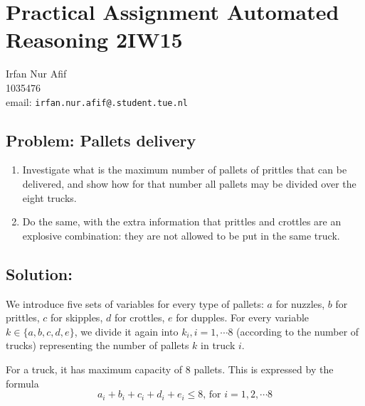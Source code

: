 \documentclass[12pt]{article}
\begin{document}
\section*{Practical
Assignment Automated Reasoning 2IW15 }

\begin{center}
Irfan Nur Afif \\
1035476\\
email: {\tt irfan.nur.afif@.student.tue.nl}
\end{center}

\vspace{8mm}

\subsection*{Problem: Pallets delivery}

\begin{enumerate}
	\item Investigate what is the maximum number of pallets of prittles that can be delivered,
	and show how for that number all pallets may be divided over the eight trucks.
	\item Do the same, with the extra information that prittles and crottles are an explosive combination: they are not allowed to be put in the same truck.
\end{enumerate}
 

\vspace{8mm}

\subsection*{Solution:}

We introduce five sets of variables for every type of pallets: $a$ for nuzzles, $b$ for prittles,  $c$ for skipples, $d$ for crottles, $e$ for dupples. For every variable $k \in\{a,b,c,d,e\}$, we divide it again into $k_i, i=1, \cdots 8$ (according to the number of trucks) representing the number of pallets $k$ in truck $i$.

For a truck, it has maximum capacity of 8 pallets. This is expressed by the formula
\[a_i + b_i + c_i + d_i + e_i \leq 8  \text{, for }  i=1,2,\cdots 8 \]
\end{document}

